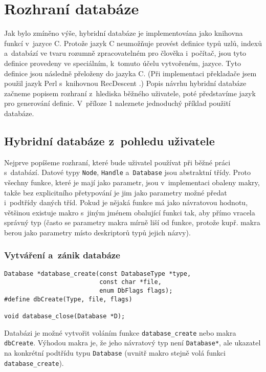 \chapter{Rozhraní databáze}
Jak bylo zmíněno výše, hybridní databáze je implementována jako knihovna
funkcí v~jazyce C. Protože jazyk C neumožňuje provést definice typů uzlů,
indexů a~databází ve tvaru rozumně zpracovatelném pro člověka i~počítač,
jsou tyto definice provedeny ve speciálním, k~tomuto účelu vytvořeném, jazyce.
Tyto definice jsou následně přeloženy do jazyka C. (Při implementaci překladače
jsem použil
jazyk Perl \cite{Perl} s~knihovnou RecDescent \cite{RecDescent}.)
Popis návrhu hybridní databáze začneme popisem rozhraní z~hlediska běžného uživatele,
poté představíme jazyk pro generování definic. V~příloze 1 naleznete jednoduchý
příklad použití databáze.

\section{Hybridní databáze z~pohledu uživatele}

Nejprve popíšeme rozhraní, které bude uživatel používat při běžné práci s~databází.
Datové typy \verb|Node|, \verb|Handle| a~\verb|Database| jsou abstraktní
třídy. Proto všechny funkce, které je mají jako parametr,
jsou v~implementaci obaleny makry, takže bez explicitního
přetypování je jim jako parametry možné předat i~podtřídy daných tříd.
Pokud je nějaká funkce má jako návratovou hodnotu, většinou existuje makro
s~jiným jménem obalující funkci tak, aby přímo vracela správný typ (často
se parametry makra mírně liší od funkce, protože kupř. makra berou jako parametry
místo deskriptorů typů jejich názvy).

\subsection{Vytváření a~zánik databáze}
\begin{verbatim}
Database *database_create(const DatabaseType *type,
                          const char *file,
                          enum DbFlags flags);
#define dbCreate(Type, file, flags)

void database_close(Database *D);
\end{verbatim}

Databázi je možné vytvořit voláním funkce \verb|database_create| nebo makra
\verb|dbCreate|. Výhodou makra je, že jeho návratový typ není \verb|Database*|,
ale ukazatel na konkrétní podtřídu typu \verb|Database| (uvnitř makro stejně volá funkci
\verb|database_create|).


